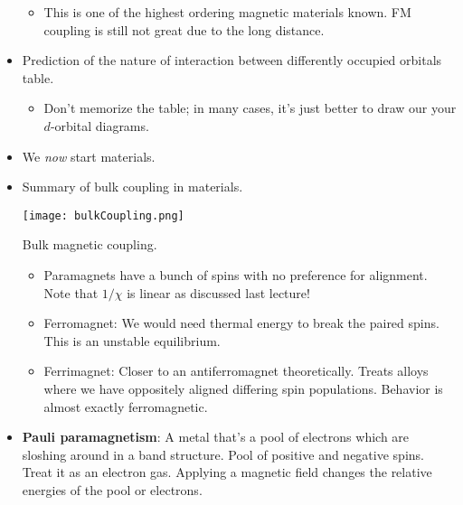 \documentclass[../notes.tex]{subfiles}
\begin{document}
\begin{itemize}
\begin{itemize}
\begin{itemize}
        \end{itemize}
        \item This is one of the highest ordering magnetic materials known. FM coupling is still not great due to the long distance.
    \end{itemize}
    \item Prediction of the nature of interaction between differently occupied orbitals table.
    \begin{itemize}
        \item Don't memorize the table; in many cases, it's just better to draw our your $d$-orbital diagrams.
    \end{itemize}
    \item We \emph{now} start materials.
    \item Summary of bulk coupling in materials.
    \begin{table}[h!]
        \centering
        \texttt{[image: bulkCoupling.png]}
        \caption{Bulk magnetic coupling.}
        \label{fig:bulkCoupling}
    \end{table}
    \begin{itemize}
        \item Paramagnets have a bunch of spins with no preference for alignment. Note that $1/\chi$ is linear as discussed last lecture!
        \item Ferromagnet: We would need thermal energy to break the paired spins. This is an unstable equilibrium.
        \item Ferrimagnet: Closer to an antiferromagnet theoretically. Treats alloys where we have oppositely aligned differing spin populations. Behavior is almost exactly ferromagnetic.
    \end{itemize}
    \item \textbf{Pauli paramagnetism}: A metal that's a pool of electrons which are sloshing around in a band structure. Pool of positive and negative spins. Treat it as an electron gas. Applying a magnetic field changes the relative energies of the pool or electrons.
    \begin{figure}[h!]
        \centering
\end{figure}
\end{itemize}
\end{document}

